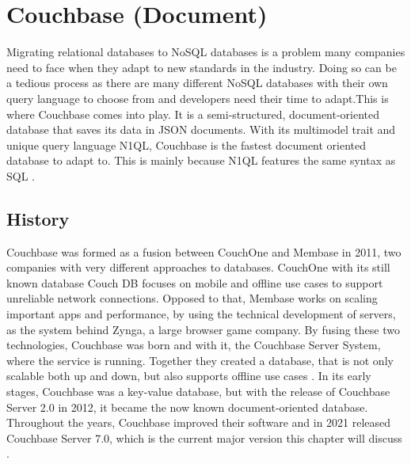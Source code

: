 
\chapter{Couchbase (Document)} \label{ch:couchbase}

Migrating relational databases to \ac{NoSQL} databases is a problem many companies need to face when they adapt to new standards in the industry. Doing so can be a tedious process as there are many different \ac{NoSQL} databases with their own query language to choose from and developers need their time to adapt.\newline This is where Couchbase comes into play. It is a semi-structured, document-oriented database that saves its data in \ac{JSON} documents. With its multimodel trait and unique query language \ac{N1QL}, Couchbase is the fastest document oriented database to adapt to. This is mainly because \ac{N1QL} features the same syntax as \ac{SQL} \parencite{BigdataInsiderOnCouchbase}. 

\section{History}
Couchbase was formed as a fusion between CouchOne and Membase in 2011, two companies with very different approaches to databases. CouchOne with its still known database Couch DB focuses on mobile and offline use cases to support unreliable network connections. Opposed to that, Membase works on scaling important apps and performance, by using the technical development of servers, as the system behind Zynga, a large browser game company. By fusing these two technologies, Couchbase was born and with it, the Couchbase Server System, where the service is running. Together they created a database, that is not only scalable both up and down, but also supports offline use cases \parencite{CouchOne-Membase-Fusion}.  \newline
In its early stages, Couchbase was a key-value database, but with the release of Couchbase Server 2.0 in 2012, it became the now known document-oriented database. Throughout the years, Couchbase improved their software and in 2021 released Couchbase Server 7.0, which is the current major version this chapter will discuss \parencite{CouchbaseAbout}. 

